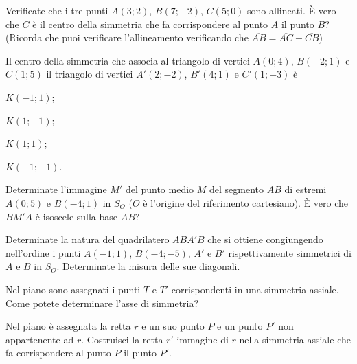 \begin{esercizio}
\label{ese:8.12}
Verificate che i tre punti $A(3;2)$, $B(7;-2)$, $C(5;0)$ sono allineati. \`E vero che $C$ è il centro della simmetria che fa corrispondere al punto $A$ il punto $B$? (Ricorda che puoi verificare l'allineamento verificando che $\overline{AB}=\overline{AC}+\overline{CB}$)
\end{esercizio}

\begin{esercizio}
\label{ese:8.13}
Il centro della simmetria che associa al triangolo di vertici $A(0;4)$, $B(-2;1)$ e $C(1;5)$ il triangolo di vertici $A'(2;-2)$, $B'(4;1)$ e $C'(1;-3)$ è
\begin{multicols}{2}
\begin{enumeratea}
\item $K(-1;1)$;
\item $K(1;-1)$;
\item $K(1;1)$;
\item $K(-1;-1)$.
\end{enumeratea}
\end{multicols}
\end{esercizio}

\begin{esercizio}
\label{ese:8.14}
Determinate l'immagine $M'$ del punto medio $M$ del segmento $AB$ di estremi $A(0;5)$ e $B(-4;1)$ in $S_O$ ($O$ è l'origine del riferimento cartesiano). \`E vero che $BM'A$ è isoscele sulla base $AB$?
\end{esercizio}

\begin{esercizio}
\label{ese:8.15}
Determinate la natura del quadrilatero $ABA'B$ che si ottiene congiungendo nell'ordine i punti $A(-1;1)$, $B(-4;-5)$, $A'$ e $B'$ rispettivamente simmetrici di $A$ e $B$ in $S_O$. Determinate la misura delle sue diagonali.
\end{esercizio}

\begin{esercizio}
\label{ese:8.16}
Nel piano sono assegnati i punti $T$ e $T'$ corrispondenti in una simmetria assiale. Come potete determinare l'asse di simmetria?
\end{esercizio}

\begin{esercizio}
\label{ese:8.17}
Nel piano è assegnata la retta $r$ e un suo punto $P$ e un punto $P'$ non appartenente ad $r$. Costruisci la retta $r'$ immagine di $r$ nella simmetria assiale che fa corrispondere al punto $P$ il punto $P'$.
\end{esercizio}

